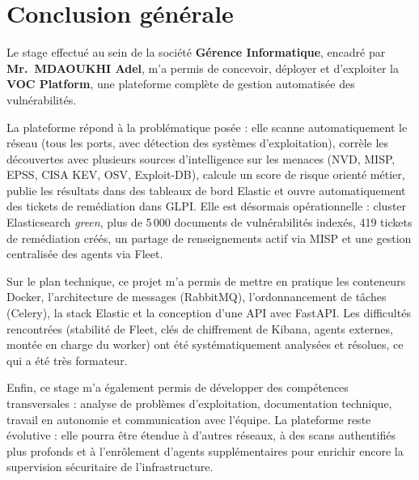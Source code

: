 \clearpage

\section{Conclusion g\'en\'erale}

Le stage effectu\'e au sein de la soci\'et\'e \textbf{G\'erence Informatique},
encadr\'e par \textbf{Mr.~MDAOUKHI Adel}, m'a permis de concevoir, d\'eployer
et d'exploiter la \textbf{VOC Platform}, une plateforme compl\`ete de gestion
automatis\'ee des vuln\'erabilit\'es.

La plateforme r\'epond \`a la probl\'ematique pos\'ee : elle scanne
automatiquement le r\'eseau (tous les ports, avec d\'etection des syst\`emes
d'exploitation), corr\`ele les d\'ecouvertes avec plusieurs sources
d'intelligence sur les menaces (NVD, MISP, EPSS, CISA KEV, OSV, Exploit-DB),
calcule un score de risque orient\'e m\'etier, publie les r\'esultats dans des
tableaux de bord Elastic et ouvre automatiquement des tickets de
rem\'ediation dans GLPI. Elle est d\'esormais op\'erationnelle : cluster
Elasticsearch \emph{green}, plus de 5\,000 documents de vuln\'erabilit\'es
index\'es, 419 tickets de rem\'ediation cr\'e\'es, un partage de
renseignements actif via MISP et une gestion centralis\'ee des agents via
Fleet.

Sur le plan technique, ce projet m'a permis de mettre en pratique les
conteneurs Docker, l'architecture de messages (RabbitMQ), l'ordonnancement de
t\^aches (Celery), la stack Elastic et la conception d'une API avec FastAPI.
Les difficult\'es rencontr\'ees (stabilit\'e de Fleet, cl\'es de chiffrement
de Kibana, agents externes, mont\'ee en charge du worker) ont \'et\'e
syst\'ematiquement analys\'ees et r\'esolues, ce qui a \'et\'e tr\`es
formateur.

Enfin, ce stage m'a \'egalement permis de d\'evelopper des comp\'etences
transversales : analyse de probl\`emes d'exploitation, documentation technique,
travail en autonomie et communication avec l'\'equipe. La plateforme reste
\'evolutive : elle pourra \^etre \'etendue \`a d'autres r\'eseaux, \`a des
scans authentifi\'es plus profonds et \`a l'enr\^olement d'agents
suppl\'ementaires pour enrichir encore la supervision s\'ecuritaire de
l'infrastructure.

\clearpage
\appendix

